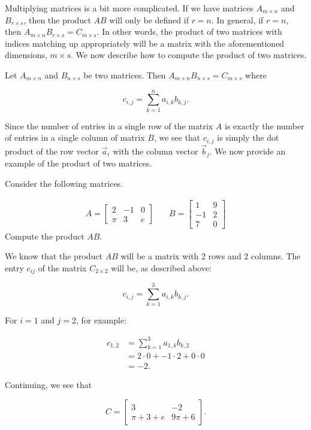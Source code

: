 Multiplying matrices is a bit more complicated.  If we have matrices $A_{m\times n}$ and $B_{r\times s}$, then the product $AB$ will only be defined if $r=n$.  In general, if $r=n$, then $A_{m\times n}B_{r\times s} = C_{m\times s}$.  In other words, the product of two matrices with indices matching up appropriately will be a matrix with the aforementioned dimensions, $m\times s$.  We now describe how to compute the product of two matrices.

Let $A_{m\times n}$ and $B_{n\times s}$ be two matrices.   Then $A_{m\times n}B_{n\times s} = C_{m\times s}$ where 

\[c_{i,j} = \sum_{k=1}^n a_{i,k}b_{k,j}.\]

Since the number of entries in a single row of the matrix $A$ is exactly the number of entries in a single column of matrix $B$, we see that $c_{i,j}$ is simply the dot product of the row vector $\vec{a}_{i}$ with the column vector $\vec{b}_j$.  We now provide an example of the product of two matrices.\\

{
Consider the following matrices.

\begin{align}
	A = \begin{bmatrix}
		2& -1& 0\\
		\pi & 3& e
	\end{bmatrix}
	&\quad B = \begin{bmatrix}
		1 & 9 \\
		-1 & 2\\
		7 & 0		
	\end{bmatrix}
\end{align}
Compute the product $AB$.
}
{
We know that the product $AB$ will be a matrix with 2 rows and 2 columns.  The entry $c_{ij}$ of the matrix $C_{2\times 2}$ will be, as described above:

\[c_{i,j} = \sum_{k=1}^3 a_{i,k}b_{k,j}.\]

For $i=1$ and $j=2$, for example:

\begin{align}
c_{1,2} &= \sum_{k=1}^3 a_{1,k}b_{k, 2}\\	
			 &= 2\cdot 0+ -1\cdot 2+0\cdot 0 \\
			 &= -2.
\end{align}

Continuing, we see that

\[C=
\begin{bmatrix}
	3 & -2\\
	\pi + 3 +e &9\pi+6
\end{bmatrix}.
\]
}\\

